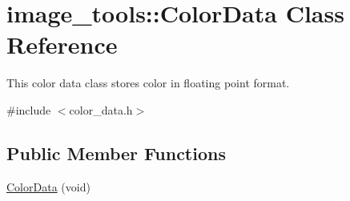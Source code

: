 \hypertarget{classimage__tools_1_1ColorData}{}\section{image\+\_\+tools\+:\+:Color\+Data Class Reference}
\label{classimage__tools_1_1ColorData}


This color data class stores color in floating point format.  




{\ttfamily \#include $<$color\+\_\+data.\+h$>$}

\subsection*{Public Member Functions}
\begin{DoxyCompactItemize}
\item 
\hyperlink{classimage__tools_1_1ColorData_ab4e00138d402bad2c0edf24f0adc40e8}{Color\+Data} (void)\hypertarget{classimage__tools_1_1ColorData_ab4e00138d402bad2c0edf24f0adc40e8}{}\label{classimage__tools_1_1ColorData_ab4e00138d402bad2c0edf24f0adc40e8}


\end{DoxyCompactItemize}
